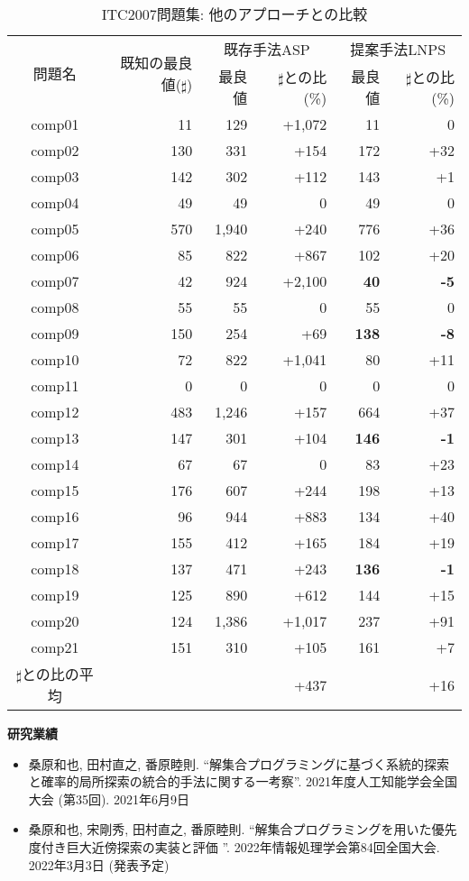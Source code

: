 \documentclass[dvipdfmx,a4paper]{jsarticle}
\begin{document}
\begin{table}[h]
 \centering
 \footnotesize
 \caption{ITC2007問題集: 他のアプローチとの比較}
{
\begin{tabular}{c|r|rr|rr}
\hline
    \multirow{2}{*}{問題名} & \multirow{2}{*}{既知の最良値($\sharp$)} & 
    \multicolumn{2}{c|}{既存手法ASP} & \multicolumn{2}{c}{提案手法LNPS}\\\cline{3-6}
    &  & 最良値 & $\sharp$との比(\%) & 最良値 & $\sharp$との比(\%)\\\hline
{comp01} & 11 & 129 & +1,072 & 11 & 0\\
{comp02} & 130 & 331 & +154 & 172 & +32\\
{comp03} & 142 & 302 & +112 & 143 & +1\\
{comp04} & 49 & 49 & 0 & 49 & 0\\
{comp05} & 570 & 1,940 & +240 & 776 & +36\\
{comp06} & 85 & 822 & +867 & 102 & +20\\
{comp07} & 42 & 924 & +2,100 & \bf{40} & \bf{-5}\\
{comp08} & 55 & 55 & 0 & 55 & 0\\
{comp09} & 150 & 254 & +69 & \bf{138} & \bf{-8}\\
{comp10} & 72 & 822 & +1,041 & 80 & +11\\
{comp11} & 0 & 0 & 0 & 0 & 0\\
{comp12} & 483 & 1,246 & +157 & 664 & +37\\
{comp13} & 147 & 301 & +104 & \bf{146} & \bf{-1}\\
{comp14} & 67 & 67 & 0 & 83 & +23\\
{comp15} & 176 & 607 & +244 & 198 & +13\\
{comp16} & 96 & 944 & +883 & 134 & +40\\
{comp17} & 155 & 412 & +165 & 184 & +19\\
{comp18} & 137 & 471 & +243 & \bf{136} & \bf{-1}\\
{comp19} & 125 & 890 & +612 & 144 & +15\\
{comp20} & 124 & 1,386 & +1,017 & 237 & +91\\
{comp21} & 151 & 310 & +105 & 161 & +7\\\hline
{$\sharp$との比の平均} & & & +437 & & +16\\\hline
 \end{tabular}
}
\end{table}

\textbf{研究業績}
\begin{itemize}\small
\item 桑原和也, 田村直之, 番原睦則.
  ``解集合プログラミングに基づく系統的探索と確率的局所探索の統合的手法に関する一考察''.
  2021年度人工知能学会全国大会 (第35回).
  2021年6月9日
\item 桑原和也, 宋剛秀, 田村直之, 番原睦則.
  ``解集合プログラミングを用いた優先度付き巨大近傍探索の実装と評価 ''.
  2022年情報処理学会第84回全国大会. 2022年3月3日 (発表予定)
\end{itemize}
\end{document}
